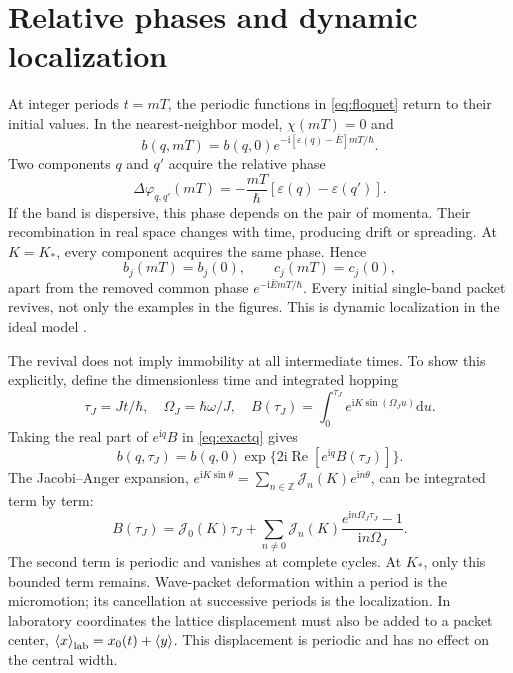 \documentclass[11pt,oneside]{report}
\numberwithin{equation}{chapter}
\newcommand{\ii}{\mathrm i}
\newcommand{\dd}{\mathrm d}
\newcommand{\avg}[1]{\left\langle #1\right\rangle}
\begin{document}
\section{Relative phases and dynamic localization}
At integer periods $t=mT$, the periodic functions in \cref{eq:floquet} return to their initial values. In the nearest-neighbor model, $\chi(mT)=0$ and
\begin{equation}
 b(q,mT)=b(q,0)e^{-\ii[\varepsilon(q)-\bar E]mT/\hbar}.
\end{equation}
Two components $q$ and $q'$ acquire the relative phase
\begin{equation}
 \Delta\varphi_{q,q'}(mT)=-\frac{mT}{\hbar}[\varepsilon(q)-\varepsilon(q')].
\end{equation}
If the band is dispersive, this phase depends on the pair of momenta. Their recombination in real space changes with time, producing drift or spreading. At $K=K_*$, every component acquires the same phase. Hence
\begin{equation}\label{eq:revival}
 b_j(mT)=b_j(0),\qquad c_j(mT)=c_j(0),
\end{equation}
apart from the removed common phase $e^{-\ii\bar E mT/\hbar}$. Every initial single-band packet revives, not only the examples in the figures. This is dynamic localization in the ideal model \cite{Dunlap1986,Eckardt2009}.

The revival does not imply immobility at all intermediate times. To show this explicitly, define the dimensionless time and integrated hopping
\begin{equation}\label{eq:Bdef}
 \tau_J=Jt/\hbar,\quad \Omega_J=\hbar\omega/J,\quad
 B(\tau_J)=\int_0^{\tau_J}e^{\ii K\sin(\Omega_Ju)}\dd u.
\end{equation}
Taking the real part of $e^{\ii q}B$ in \cref{eq:exactq} gives
\begin{equation}\label{eq:phaseB}
 b(q,\tau_J)=b(q,0)\exp\{2\ii\operatorname{Re}[e^{\ii q}B(\tau_J)]\}.
\end{equation}
The Jacobi--Anger expansion, $e^{\ii K\sin\theta}=\sum_{n\in\mathbb Z}\mathcal J_n(K)e^{\ii n\theta}$, can be integrated term by term:
\begin{equation}\label{eq:Bseries}
 B(\tau_J)=\mathcal J_0(K)\tau_J+
 \sum_{n\ne0}\mathcal J_n(K)\frac{e^{\ii n\Omega_J\tau_J}-1}{\ii n\Omega_J}.
\end{equation}
The second term is periodic and vanishes at complete cycles. At $K_*$, only this bounded term remains. Wave-packet deformation within a period is the micromotion; its cancellation at successive periods is the localization. In laboratory coordinates the lattice displacement must also be added to a packet center, $\avg{x}_{\rm lab}=x_0(t)+\avg y$. This displacement is periodic and has no effect on the central width.
\end{document}
